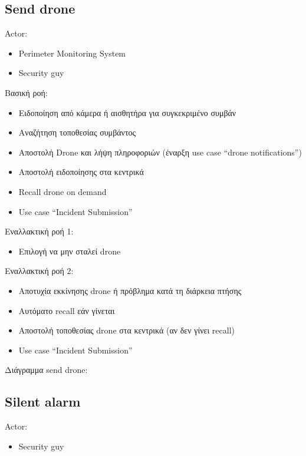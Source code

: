 \documentclass{article}
\begin{document}
\subsection{Send drone}

\noindent Actor:
\begin{itemize}
    \item Perimeter Monitoring System
    \item Security guy
\end{itemize}

\noindent Βασική ροή:
\begin{itemize}
    \item Ειδοποίηση από κάμερα ή αισθητήρα για συγκεκριμένο συμβάν
    \item Αναζήτηση τοποθεσίας συμβάντος
    \item Αποστολή Drone και λήψη πληροφοριών (έναρξη use case “drone notifications”)
    \item Αποστολή ειδοποίησης στα κεντρικά
    \item Recall drone on demand
    \item Use case “Incident Submission”
\end{itemize}

\noindent Εναλλακτική ροή 1:
\begin{itemize}
    \item Επιλογή να μην σταλεί drone
\end{itemize}

\noindent Εναλλακτική ροή 2:
\begin{itemize}
    \item Αποτυχία εκκίνησης drone ή πρόβλημα κατά τη διάρκεια πτήσης
    \item Αυτόματο recall εάν γίνεται
    \item Αποστολή τοποθεσίας drone στα κεντρικά (αν δεν γίνει recall)
    \item Use case “Incident Submission”
\end{itemize}

\newpage
\noindent Διάγραμμα send drone: \\
\noindent{}
\newpage

\subsection{Silent alarm}

\noindent Actor:
\begin{itemize}
    \item Security guy
\end{itemize}
\end{document}
